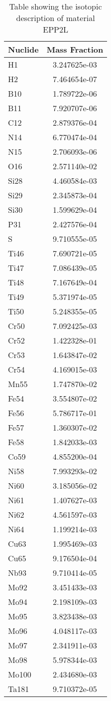 \begin{centering}
\begin{table}[ht!]
\begin{tabular}{l | c}
\hline
Nuclide & Mass Fraction\\
\hline
H1 & 3.247625e-03\\
H2 & 7.464654e-07\\
B10 & 1.789722e-06\\
B11 & 7.920707e-06\\
C12 & 2.879376e-04\\
N14 & 6.770474e-04\\
N15 & 2.706093e-06\\
O16 & 2.571140e-02\\
Si28 & 4.460584e-03\\
Si29 & 2.345873e-04\\
Si30 & 1.599629e-04\\
P31 & 2.427576e-04\\
S & 9.710555e-05\\
Ti46 & 7.690721e-05\\
Ti47 & 7.086439e-05\\
Ti48 & 7.167649e-04\\
Ti49 & 5.371974e-05\\
Ti50 & 5.248355e-05\\
Cr50 & 7.092425e-03\\
Cr52 & 1.422328e-01\\
Cr53 & 1.643847e-02\\
Cr54 & 4.169015e-03\\
Mn55 & 1.747870e-02\\
Fe54 & 3.554807e-02\\
Fe56 & 5.786717e-01\\
Fe57 & 1.360307e-02\\
Fe58 & 1.842033e-03\\
Co59 & 4.855200e-04\\
Ni58 & 7.993293e-02\\
Ni60 & 3.185056e-02\\
Ni61 & 1.407627e-03\\
Ni62 & 4.561597e-03\\
Ni64 & 1.199214e-03\\
Cu63 & 1.995469e-03\\
Cu65 & 9.176504e-04\\
Nb93 & 9.710414e-05\\
Mo92 & 3.451433e-03\\
Mo94 & 2.198109e-03\\
Mo95 & 3.823438e-03\\
Mo96 & 4.048117e-03\\
Mo97 & 2.341911e-03\\
Mo98 & 5.978344e-03\\
Mo100 & 2.434680e-03\\
Ta181 & 9.710372e-05
\end{tabular}
\caption{Table showing the isotopic description of material EPP2L}
\label{table:material_EPP2L}
\end{table}\clearpage


\end{centering}
